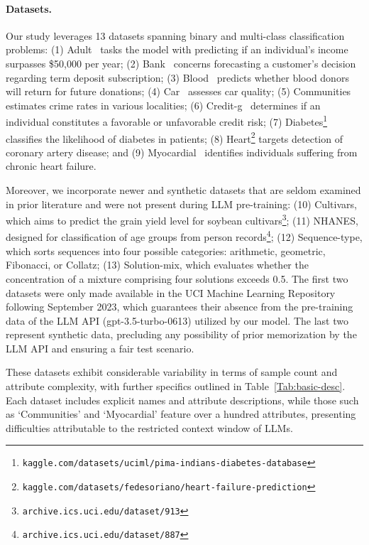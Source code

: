 \paragraph{Datasets.}
Our study leverages 13 datasets spanning binary and multi-class classification problems: (1) Adult~\cite{asuncion2007uci} tasks the model with predicting if an individual's income surpasses \$50,000 per year; (2) Bank~\cite{moro2014data} concerns forecasting a customer’s decision regarding term deposit subscription; (3) Blood~\cite{yeh2009knowledge} predicts whether blood donors will return for future donations; (4) Car~\cite{kadra2021well} assesses car quality; (5) Communities~\cite{misc_communities_and_crime_183} estimates crime rates in various localities; (6) Credit-g~\cite{kadra2021well} determines if an individual constitutes a favorable or unfavorable credit risk; (7) Diabetes\footnote{\texttt{kaggle.com/datasets/uciml/pima-indians-diabetes-database}} classifies the likelihood of diabetes in patients; (8) Heart\footnote{\texttt{kaggle.com/datasets/fedesoriano/heart-failure-prediction}} targets detection of coronary artery disease; and (9) Myocardial~\cite{misc_myocardial_infarction_complications_579} identifies individuals suffering from chronic heart failure.

Moreover, we incorporate newer and synthetic datasets that are seldom examined in prior literature and were not present during LLM pre-training: (10) Cultivars, which aims to predict the grain yield level for soybean cultivars\footnote{\texttt{archive.ics.uci.edu/dataset/913}}; (11) NHANES, designed for classification of age groups from person records\footnote{\texttt{archive.ics.uci.edu/dataset/887}}; (12) Sequence-type, which sorts sequences into four possible categories: arithmetic, geometric, Fibonacci, or Collatz; (13) Solution-mix, which evaluates whether the concentration of a mixture comprising four solutions exceeds 0.5. The first two datasets were only made available in the UCI Machine Learning Repository following September 2023, which guarantees their absence from the pre-training data of the LLM API (gpt-3.5-turbo-0613) utilized by our model. The last two represent synthetic data, precluding any possibility of prior memorization by the LLM API and ensuring a fair test scenario.

These datasets exhibit considerable variability in terms of sample count and attribute complexity, with further specifics outlined in Table~\ref{Tab:basic-desc}. Each dataset includes explicit names and attribute descriptions, while those such as `Communities' and `Myocardial' feature over a hundred attributes, presenting difficulties attributable to the restricted context window of LLMs.

